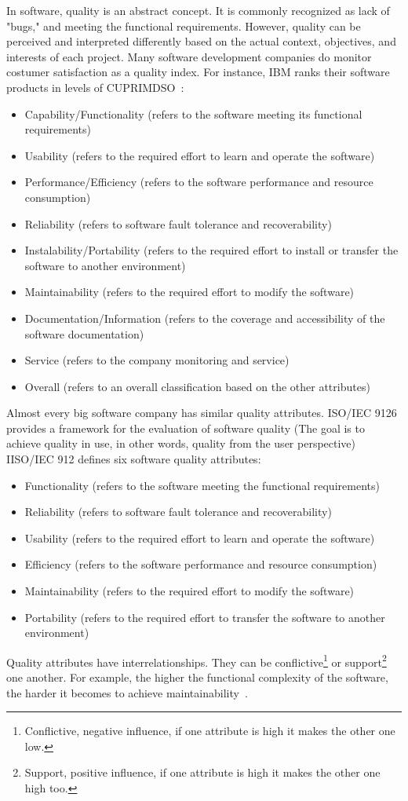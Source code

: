 In software, quality is an abstract concept. It is commonly recognized as lack of "bugs," and meeting the functional requirements.
However, quality can be perceived and interpreted differently based on the actual context, objectives, and interests of each project.
Many software development companies do monitor costumer satisfaction as a quality index.
For instance, IBM ranks their software products in levels of CUPRIMDSO~\cite{kan2002metrics}:
\begin{itemize}
\item Capability/Functionality (refers to the software meeting its functional requirements)
\item Usability (refers to the required effort to learn and operate the software)
\item Performance/Efficiency (refers to the software performance and resource consumption)
\item Reliability (refers to software fault tolerance and recoverability)
\item Instalability/Portability (refers to the required effort to install or transfer the software to another environment)
\item Maintainability (refers to the required effort to modify the software)
\item Documentation/Information (refers to the coverage and accessibility of the software documentation)
\item Service (refers to the company monitoring and service)
\item Overall (refers to an overall classification based on the other attributes)
\end{itemize}
Almost every big software company has similar quality attributes.
ISO/IEC 9126 provides a framework for the evaluation of software quality (The goal is to achieve quality in use, in other words, quality from the user perspective)~\cite{bevan1999quality}
IISO/IEC 912 defines six software quality attributes:
\begin{itemize}
\item Functionality (refers to the software meeting the functional requirements)
\item Reliability (refers to software fault tolerance and recoverability)
\item Usability (refers to the required effort to learn and operate the software)
\item Efficiency (refers to the software performance and resource consumption)
\item Maintainability (refers to the required effort to modify the software)
\item Portability (refers to the required effort to transfer the software to another environment)
\end{itemize}
Quality attributes have interrelationships.
They can be
conflictive\footnote{Conflictive, negative influence, if one attribute is high it makes the other one low.} or
support\footnote{Support, positive influence, if one attribute is high it makes the other one high too.} one another.
For example, the higher the functional complexity of the software, the harder it becomes to achieve maintainability~\cite{kan2002metrics}.

